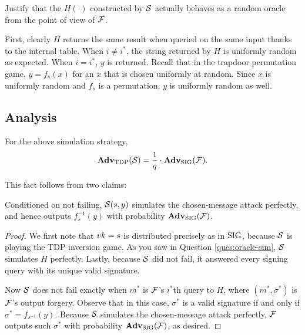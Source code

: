\documentclass[11pt]{article}
\begin{document}
\begin{question}[ID=oracle-sim]
  Justify that the \(H(\cdot)\) constructed by \(\mathcal{S}\) actually
  behaves as a random oracle from the point of view of \(\mathcal{F}\).
\end{question}
  
\begin{answer}
  First, clearly \(H\) returns the same result when queried on the
  same input thanks to the internal table. When \(i \neq i^*\), the
  string returned by \(H\) is uniformly random as expected. When
  \(i = i^*\), \(y\) is returned. Recall that in the trapdoor
  permutation game, \(y = f_s(x)\) for an \(x\) that is chosen
  uniformly at random. Since \(x\) is uniformly random and \(f_s\) is
  a permutation, \(y\) is uniformly random as well.
\end{answer}

\subsection{Analysis}

\begin{lemma}
  \label{lem:adv-Sim}
  For the above simulation strategy,
  \[ \mathbf{Adv}_{\text{TDP}}(\mathcal{S}) = \frac{1}{q} \cdot \mathbf{Adv}_{\text{SIG}}(\mathcal{F}). \]
\end{lemma}

\noindent This fact follows from two claims:

\begin{claim}
  Conditioned on not failing, $\mathcal{S}(s,y)$ simulates the chosen-message
  attack perfectly, and hence outputs $f_{s}^{-1}(y)$ with probability
  $\mathbf{Adv}_{\text{SIG}}(\mathcal{F})$.
\end{claim}

\begin{proof}
  We first note that $vk=s$ is distributed precisely as in $\text{SIG}$,
  because $\mathcal{S}$ is playing the TDP inversion game.  As you saw in Question
  \ref{ques:oracle-sim}, $\mathcal{S}$ simulates \(H\) perfectly.  Lastly, because $\mathcal{S}$
  did not fail, it answered every signing query with its unique valid
  signature.

  Now $\mathcal{S}$ does not fail exactly when $m^{*}$ is $\mathcal{F}$'s $i^{*}$th
  query to $H$, where $(m^{*}, \sigma^{*})$ is $\mathcal{F}$'s output
  forgery.  Observe that in this case, $\sigma^*$ is a valid signature
  if and only if $\sigma^*=f_{s^{-1}}(y)$.  Because $\mathcal{S}$ simulates
  the chosen-message attack perfectly, $\mathcal{F}$ outputs such
  $\sigma^{*}$ with probability $\mathbf{Adv}_{\text{SIG}}(\mathcal{F})$, as desired.
\end{proof}
\end{document}
